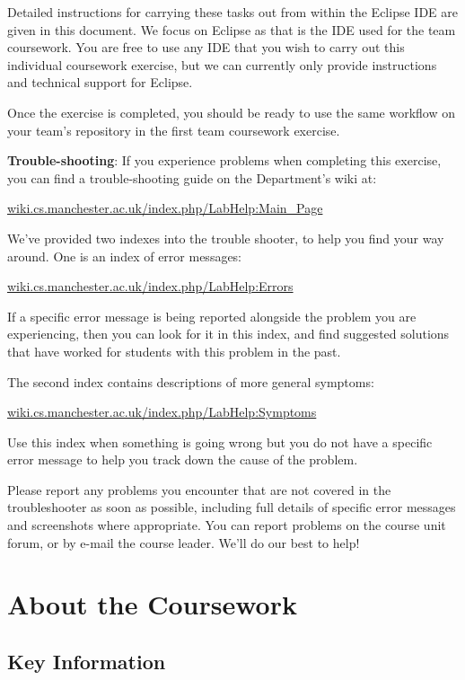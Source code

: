 \documentclass[
]{book}
\begin{document}
Detailed instructions for carrying these tasks out from within the Eclipse IDE are given in this document. We focus on Eclipse as that is the IDE used for the team coursework. You are free to use any IDE that you wish to carry out this individual coursework exercise, but we can currently only provide instructions and technical support for Eclipse.

Once the exercise is completed, you should be ready to use the same workflow on your team's repository in the first team coursework exercise.

\textbf{Trouble-shooting}: If you experience problems when completing this exercise, you can find a trouble-shooting guide on the Department's wiki at:

\href{https://wiki.cs.manchester.ac.uk/index.php/LabHelp:Main_Page}{wiki.cs.manchester.ac.uk/index.php/LabHelp:Main\_Page}

We've provided two indexes into the trouble shooter, to help you find your way around. One is an index of error messages:

\href{https://wiki.cs.manchester.ac.uk/index.php/LabHelp:Errors}{wiki.cs.manchester.ac.uk/index.php/LabHelp:Errors}

If a specific error message is being reported alongside the problem you are experiencing, then you can look for it in this index, and find suggested solutions that have worked for students with this problem in the past.

The second index contains descriptions of more general symptoms:

\href{https://wiki.cs.manchester.ac.uk/index.php/LabHelp:Symptoms}{wiki.cs.manchester.ac.uk/index.php/LabHelp:Symptoms}

Use this index when something is going wrong but you do not have a specific error message to help you track down the cause of the problem.

Please report any problems you encounter that are not covered in the troubleshooter as soon as possible, including full details of specific error messages and screenshots where appropriate. You can report problems on the course unit forum, or by e-mail the course leader. We'll do our best to help!

\hypertarget{about}{%
\section{About the Coursework}\label{about}}

\hypertarget{key}{%
\subsection{Key Information}\label{key}}
\end{document}
